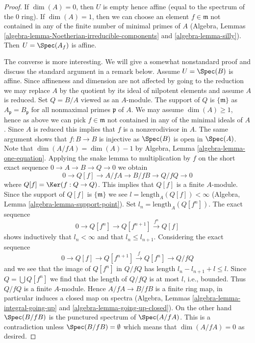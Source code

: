 \begin{proof}
If $\dim(A) = 0$, then $U$ is empty hence affine (equal to the spectrum of
the $0$ ring). If $\dim(A) = 1$, then we can choose an element
$f \in \mathfrak m$ not contained in any of the finite number of minimal
primes of $A$
(Algebra, Lemmas \ref{algebra-lemma-Noetherian-irreducible-components} and
\ref{algebra-lemma-silly}). Then $U = \Spec(A_f)$
is affine.

\medskip\noindent
The converse is more interesting. We will give a somewhat nonstandard proof
and discuss the standard argument in a remark below.
Assume $U = \Spec(B)$ is affine. Since affineness and dimension are not
affected by going to the reduction we may replace $A$ by the quotient by
its ideal of nilpotent elements and assume $A$ is reduced.
Set $Q = B/A$ viewed as an $A$-module.
The support of $Q$ is $\{\mathfrak m\}$ as $A_\mathfrak p = B_\mathfrak p$
for all nonmaximal primes $\mathfrak p$ of $A$.
We may assume $\dim(A) \geq 1$, hence as above we can pick
$f \in \mathfrak m$ not contained in any of the minimal ideals of $A$.
Since $A$ is reduced this implies that $f$ is a nonzerodivisor in $A$.
The same argument shows that $f : B \to B$ is injective as $\Spec(B)$
is open in $\Spec(A)$. Note that $\dim(A/fA) = \dim(A) - 1$ by
Algebra, Lemma \ref{algebra-lemma-one-equation}.
Applying the snake lemma to multiplication by $f$ on the short
exact sequence $0 \to A \to B \to Q \to 0$ we obtain
$$
0 \to Q[f] \to A/fA \to B/fB \to Q/fQ \to 0
$$
where $Q[f] = \Ker(f : Q \to Q)$.
This implies that $Q[f]$ is a finite $A$-module. Since the support of
$Q[f]$ is $\{\mathfrak m\}$ we see $l = \text{length}_A(Q[f]) < \infty$
(Algebra, Lemma \ref{algebra-lemma-support-point}).
Set $l_n = \text{length}_A(Q[f^n])$. The exact sequence
$$
0 \to Q[f^n] \to Q[f^{n + 1}] \xrightarrow{f^n} Q[f]
$$
shows inductively that $l_n < \infty$ and that $l_n \leq l_{n + 1}$.
Considering the exact sequence
$$
0 \to Q[f] \to Q[f^{n + 1}] \xrightarrow{f} Q[f^n] \to Q/fQ
$$
and we see that the image of $Q[f^n]$ in $Q/fQ$ has length
$l_n - l_{n + 1} + l \leq l$. Since $Q = \bigcup Q[f^n]$ we
find that the length of $Q/fQ$ is at most $l$, i.e., bounded.
Thus $Q/fQ$ is a finite $A$-module. Hence $A/fA \to B/fB$ is a
finite ring map, in particular induces a closed map on spectra
(Algebra, Lemmas \ref{algebra-lemma-integral-going-up} and
\ref{algebra-lemma-going-up-closed}).
On the other hand $\Spec(B/fB)$ is the punctured spectrum of $\Spec(A/fA)$.
This is a contradiction unless $\Spec(B/fB) = \emptyset$ which
means that $\dim(A/fA) = 0$ as desired.
\end{proof}

